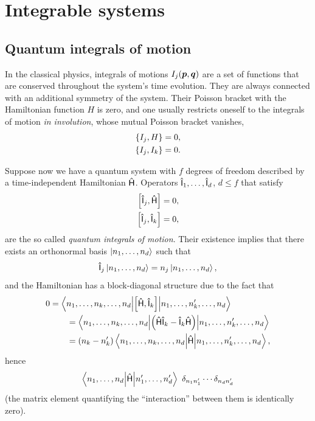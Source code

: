 \documentclass[a4paper,11pt,twoside]{article}
\begin{document}
\section{Integrable systems}\label{sec:Integrable}
    \subsection{Quantum integrals of motion}
        In the classical physics, integrals of motions $I_j(\boldsymbol{p},\boldsymbol{q})$ are a set of functions that are conserved throughout the system's time evolution.
        They are always connected with an additional symmetry of the system.
        Their Poisson bracket with the Hamiltonian function $H$ is zero, and one usually restricts oneself to the integrals of motion \emph{in involution}, whose mutual Poisson bracket vanishes,
        \begin{align}
            \left\{{I_{j}},{H}\right\}=0,\nonumber\\
            \left\{{I_{j}},{I_{k}}\right\}=0.
        \end{align}
        
        Suppose now we have a quantum system with $f$ degrees of freedom described by a time-independent Hamiltonian $\mathsf{\hat{H}}$.
        Operators $\mathsf{\hat{I}}_{1},\dotsc,\mathsf{\hat{I}}_{d}$, $d\leq f$ that satisfy
        \begin{align}
            \left[{\mathsf{\hat{I}}_{j}},{\mathsf{\hat{H}}}\right]&=0,\nonumber\\
            \left[{\mathsf{\hat{I}}_{j}},{\mathsf{\hat{I}}_{k}}\right]&=0,
        \end{align}
        are the so called \emph{quantum integrals of motion}.
        Their existence implies that there exists an orthonormal basis $\left|{n_{1},\dotsc,n_{d}}\right\rangle$ such that 
        \begin{equation}
            \mathsf{\hat{I}}_{j}\left|{n_{1},\dotsc,n_{d}}\right\rangle=n_{j}\left|{n_{1},\dotsc,n_{d}}\right\rangle,
        \end{equation}
        and the Hamiltonian has a block-diagonal structure due to the fact that
        \begin{align}
            0&=\left\langle{n_{1},\dotsc,n_{k},\dotsc,n_{d}}\middle|{\left[{\mathsf{\hat{H}}},{\mathsf{\hat{I}}_{k}}\right]}\middle|{n_{1},\dotsc,n'_{k},\dotsc,n_{d}}\right\rangle\nonumber\\
            &\qquad=\left\langle{n_{1},\dotsc,n_{k},\dotsc,n_{d}}\middle|{\left(\mathsf{\hat{H}}\mathsf{\hat{I}}_{k}-\mathsf{\hat{I}}_{k}\mathsf{\hat{H}}\right)}\middle|{n_{1},\dotsc,n'_{k},\dotsc,n_{d}}\right\rangle\\
            &\qquad=\left(n_{k}-n'_{k}\right)\left\langle{n_{1},\dotsc,n_{k},\dotsc,n_{d}}\middle|{\mathsf{\hat{H}}}\middle|{n_{1},\dotsc,n'_{k},\dotsc,n_{d}}\right\rangle,\nonumber
        \end{align}
        hence
        \begin{equation}
            \left\langle{n_{1},\dotsc,n_{d}}\middle|{\mathsf{\hat{H}}}\middle|{n'_{1},\dotsc,n'_{d}}\right\rangle~\delta_{n_{1}n'_{1}}\dotsb\delta_{n_{d}n'_{d}}
        \end{equation}
         (the matrix element quantifying the ``interaction'' between them is identically zero).
\end{document}
